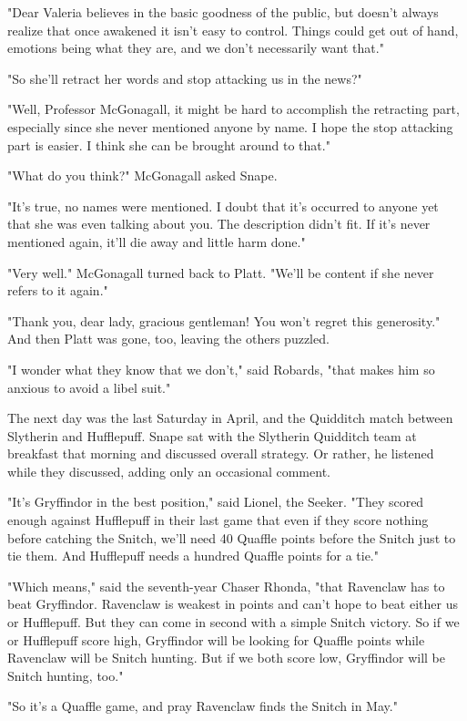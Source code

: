 "Dear Valeria believes in the basic goodness of the public, but doesn't always realize that once awakened it isn't easy to control. Things could get out of hand, emotions being what they are, and we don't necessarily want that."

"So she'll retract her words and stop attacking us in the news?"

"Well, Professor McGonagall, it might be hard to accomplish the retracting part, especially since she never mentioned anyone by name. I hope the stop attacking part is easier. I think she can be brought around to that."

"What do you think?" McGonagall asked Snape.

"It's true, no names were mentioned. I doubt that it's occurred to anyone yet that she was even talking about you. The description didn't fit. If it's never mentioned again, it'll die away and little harm done."

"Very well." McGonagall turned back to Platt. "We'll be content if she never refers to it again."

"Thank you, dear lady, gracious gentleman! You won't regret this generosity." And then Platt was gone, too, leaving the others puzzled.

"I wonder what they know that we don't," said Robards, "that makes him so anxious to avoid a libel suit."

The next day was the last Saturday in April, and the Quidditch match between Slytherin and Hufflepuff. Snape sat with the Slytherin Quidditch team at breakfast that morning and discussed overall strategy. Or rather, he listened while they discussed, adding only an occasional comment.

"It's Gryffindor in the best position," said Lionel, the Seeker. "They scored enough against Hufflepuff in their last game that even if they score nothing before catching the Snitch, we'll need 40 Quaffle points before the Snitch just to tie them. And Hufflepuff needs a hundred Quaffle points for a tie."

"Which means," said the seventh-year Chaser Rhonda, "that Ravenclaw has to beat Gryffindor. Ravenclaw is weakest in points and can't hope to beat either us or Hufflepuff. But they can come in second with a simple Snitch victory. So if we or Hufflepuff score high, Gryffindor will be looking for Quaffle points while Ravenclaw will be Snitch hunting. But if we both score low, Gryffindor will be Snitch hunting, too."

"So it's a Quaffle game, and pray Ravenclaw finds the Snitch in May."

